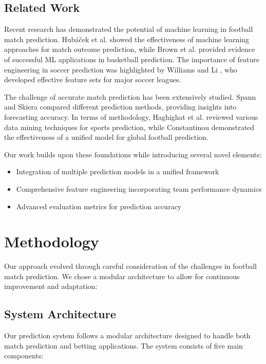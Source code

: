 \documentclass[conference]{IEEEtran}
\begin{document}
\subsection{Related Work}
Recent research has demonstrated the potential of machine learning in football match prediction. Hub{\'a}{\v{c}}ek et al. \cite{hubacek2019exploiting} showed the effectiveness of machine learning approaches for match outcome prediction, while Brown et al. \cite{brown2018machine} provided evidence of successful ML applications in basketball prediction. The importance of feature engineering in soccer prediction was highlighted by Williams and Li \cite{williams2010simple}, who developed effective feature sets for major soccer leagues.

The challenge of accurate match prediction has been extensively studied. Spann and Skiera \cite{spann2009sports} compared different prediction methods, providing insights into forecasting accuracy. In terms of methodology, Haghighat et al. \cite{haghighat2013review} reviewed various data mining techniques for sports prediction, while Constantinou \cite{constantinou2019dolores} demonstrated the effectiveness of a unified model for global football prediction.

Our work builds upon these foundations while introducing several novel elements:
\begin{itemize}
\item Integration of multiple prediction models in a unified framework
\item Comprehensive feature engineering incorporating team performance dynamics
\item Advanced evaluation metrics for prediction accuracy
\end{itemize}

\section{Methodology}
Our approach evolved through careful consideration of the challenges in football match prediction. We chose a modular architecture to allow for continuous improvement and adaptation:

\subsection{System Architecture}
Our prediction system follows a modular architecture designed to handle both match prediction and betting applications. The system consists of five main components:
\end{document}
